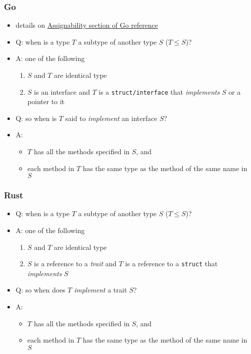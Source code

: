 \documentclass[12pt,dvipdfmx]{beamer}
\newcommand{\ao}[1]{{\color{blue}#1}}
\begin{document}
\begin{frame}
  \frametitle{Go}
  \begin{itemize}
  \item details on \href{https://go.dev/ref/spec\#Assignability}{Assignability section of Go reference}
  \item<1-> Q: when is a type $T$ a subtype of another type $S$ ($T \leq S$)?
  \item<2-> A: one of the following
    \begin{enumerate}
    \item $S$ and $T$ are identical type
    \item $S$ is an interface and $T$ is a {\tt struct/interface} that {\it implements} $S$ or a pointer to it
    \end{enumerate}
  \item<3-> Q: so when is $T$ said to {\it implement} an interface $S$?
  \item<4-> A:
    \begin{itemize}
    \item $T$ has all the methods specified in $S$, and 
    \item each method in $T$ has the same type as the method of the same name in $S$
    \end{itemize}
  \end{itemize}
\end{frame}


\begin{frame}
  \frametitle{Rust}
  \begin{itemize}
  \item<1-> Q: when is a type $T$ a subtype of another type $S$ ($T \leq S$)?
  \item<2-> A: one of the following
    \begin{enumerate}
    \item $S$ and $T$ are identical type
    \item $S$ is a reference to a \ao{\it trait}
      and $T$ is a reference to a {\tt struct} that {\it implements} $S$
    \end{enumerate}
  \item<3-> Q: so when does $T$ {\it implement} a trait  $S$?
  \item<4-> A:
    \begin{itemize}
    \item $T$ has all the methods specified in $S$, and 
    \item each method in $T$ has the same type as the method of the same name in $S$
    \end{itemize}
  \end{itemize}
\end{frame}
\end{document}
